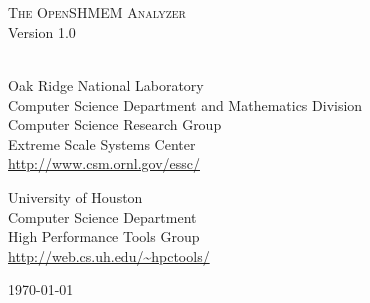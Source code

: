 \begin{titlepage}
  \begin{center}

    \vspace{1.0in} ~ \\

    \HRule \\[0.1in]
    {\LARGE \textsc{The OpenSHMEM Analyzer}} \\
    \vspace{0.2in}
    {\LARGE Version 1.0} \\
    \HRule \\[0.5in]

    \vspace{0.5in}

    Oak Ridge National Laboratory \\
    Computer Science Department and Mathematics Division \\
    Computer Science Research Group \\
    Extreme Scale Systems Center \\
    \vspace{0.1in}
    {\small \url{http://www.csm.ornl.gov/essc/}} \\

    \vspace{0.4in}

    University of Houston \\
    Computer Science Department \\
    High Performance Tools Group \\
    \vspace{0.1in}
    {\small \url{http://web.cs.uh.edu/~hpctools/}}

    \vspace{1.0in}

    \today

  \end{center}
\end{titlepage}
